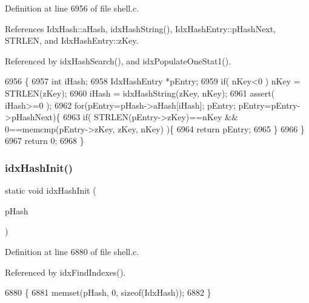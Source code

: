 Definition at line 6956 of file shell.\+c.



References Idx\+Hash\+::a\+Hash, idx\+Hash\+String(), Idx\+Hash\+Entry\+::p\+Hash\+Next, S\+T\+R\+L\+EN, and Idx\+Hash\+Entry\+::z\+Key.



Referenced by idx\+Hash\+Search(), and idx\+Populate\+One\+Stat1().


\begin{DoxyCode}
6956                                                                             \{
6957   \textcolor{keywordtype}{int} iHash;
6958   IdxHashEntry *pEntry;
6959   \textcolor{keywordflow}{if}( nKey<0 ) nKey = STRLEN(zKey);
6960   iHash = idxHashString(zKey, nKey);
6961   assert( iHash>=0 );
6962   \textcolor{keywordflow}{for}(pEntry=pHash->aHash[iHash]; pEntry; pEntry=pEntry->pHashNext)\{
6963     \textcolor{keywordflow}{if}( STRLEN(pEntry->zKey)==nKey && 0==memcmp(pEntry->zKey, zKey, nKey) )\{
6964       \textcolor{keywordflow}{return} pEntry;
6965     \}
6966   \}
6967   \textcolor{keywordflow}{return} 0;
6968 \}
\end{DoxyCode}
\mbox{\label{shell_8c_a26017295a646db6b2bebffd274f5325d}} 
\subsubsection{idx\+Hash\+Init()}
{\footnotesize\ttfamily static void idx\+Hash\+Init (\begin{DoxyParamCaption}\item[{\textbf{ Idx\+Hash} $\ast$}]{p\+Hash }\end{DoxyParamCaption})\hspace{0.3cm}{\ttfamily [static]}}



Definition at line 6880 of file shell.\+c.



Referenced by idx\+Find\+Indexes().


\begin{DoxyCode}
6880                                        \{
6881   memset(pHash, 0, \textcolor{keyword}{sizeof}(IdxHash));
6882 \}
\end{DoxyCode}
\mbox{\label{shell_8c_ade8050b9a18bb9c6fc32dd0722691786}} 
